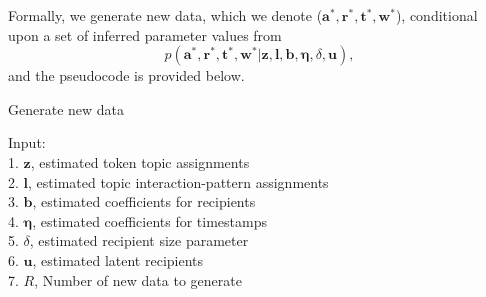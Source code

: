 \documentclass[twoside]{article}
\begin{document}
     Formally, we generate new data, which we denote ($\boldsymbol{a}^*, \boldsymbol{r}^*, \boldsymbol{t}^*, \boldsymbol{w}^*$), conditional upon a set of inferred parameter values from
     \begin{equation*}
 p(\boldsymbol{a}^*, \boldsymbol{r}^*, \boldsymbol{t}^*, \boldsymbol{w}^* |\boldsymbol{z},  \boldsymbol{l}, \boldsymbol{b}, \boldsymbol{\eta}, \delta, \boldsymbol{u}),
     \label{eqn:PPC}
     \end{equation*}
     and the pseudocode is provided below.  
     \begin{algorithm}[H]
     	\footnotesize
     	\SetAlgoLined
     	\caption{Generate new data}
     	Input:\\
     	1. $\boldsymbol{z}$, estimated token topic assignments\\
     	2. $\boldsymbol{l}$, estimated topic interaction-pattern assignments\\
     	3. $\boldsymbol{b}$,  estimated coefficients for recipients \\
     	4. $\boldsymbol{\eta}$,  estimated coefficients for timestamps\\
     	5. $\delta$, estimated recipient size parameter\\
     	6. $\boldsymbol{u}$, estimated latent recipients \\
     	7. $R$, Number of new data to generate\\
     	
     	 {
         }		
     \end{algorithm}        
  	  
\end{document}
